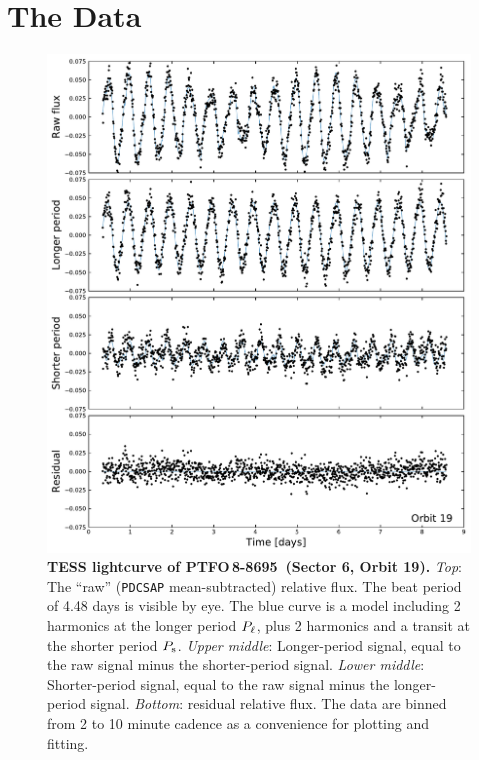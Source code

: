 \documentclass[12pt,twocolumn,tighten]{aastex62}
\newcommand{\ptfo}{PTFO$\,$8-8695}
\begin{document}
\section{The Data}
\label{sec:observations}

\begin{figure}[t!]
	\begin{center}
		\leavevmode
		\includegraphics[width=1\textwidth]{f1.pdf}
	\end{center}
	\vspace{-0.7cm}
	\caption{
    {\bf TESS lightcurve of \ptfo\ (Sector 6, Orbit 19).} {\it Top}:
    The ``raw'' (\texttt{PDCSAP} mean-subtracted) relative flux.
    The beat period of 4.48 days is visible by eye.  The blue curve is
    a model including 2 harmonics at the longer period $P_{\rm \ell}$,
    plus 2 harmonics and a transit at the shorter period $P_{\rm s}$.
    {\it Upper middle}: Longer-period signal, equal to the raw signal
    minus the shorter-period signal.  {\it Lower middle}:
    Shorter-period signal, equal to the raw signal minus the
    longer-period signal.  {\it Bottom}: residual relative flux.  The
    data are binned from 2 to 10 minute cadence as a convenience for
    plotting and fitting.
		\label{fig:splitsignal}
	}
\end{figure}
\end{document}
